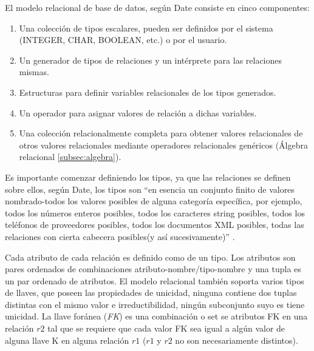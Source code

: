 El modelo relacional de base de datos, según Date \cite{date12} consiste en cinco componentes:
\begin{enumerate}
    \item Una colección de tipos escalares, pueden ser definidos por el sistema (INTEGER, CHAR, BOOLEAN, etc.) o por el usuario.
    \item Un generador de tipos de relaciones y un intérprete para las relaciones mismas.
    \item Estructuras para definir variables relacionales de los tipos generados.
    \item Un operador para asignar valores de relación a dichas variables.
    \item Una colección relacionalmente completa para obtener valores relacionales de otros valores relacionales mediante operadores relacionales genéricos (Álgebra relacional \ref{subsec:algebra}).
\end{enumerate}
Es importante comenzar definiendo los tipos, ya que las relaciones se definen sobre ellos, según Date, los tipos son ``en esencia un conjunto finito de valores nombrado-todos los valores posibles de alguna categoría específica, por ejemplo, todos los números enteros posibles, todos los caracteres string posibles, todos los teléfonos de proveedores posibles, todos los documentos XML posibles, todas las relaciones con cierta cabecera posibles(y así sucesivamente)'' \cite{date12}.

Cada atributo de cada relación es definido como de un tipo. Los atributos son pares ordenados de combinaciones atributo-nombre/tipo-nombre y una tupla es un par ordenado de atributos.
El modelo relacional también soporta varios tipos de llaves, que poseen las propiedades de unicidad, ninguna contiene dos tuplas distintas con el mismo valor e irreductibilidad, ningún subconjunto suyo es tiene unicidad. La llave foránea (\emph{FK}) es una combinación o set se atributos FK en una relación $r2$ tal que se requiere que cada valor FK sea igual a algún valor de alguna llave K en alguna relación $r1$ ($r1$ y $r2$ no son necesariamente distintos).

